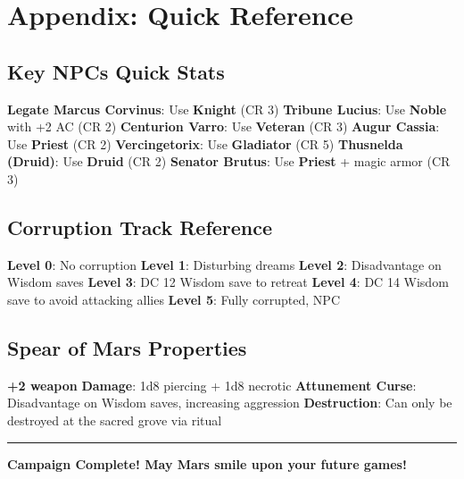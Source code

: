 \documentclass[
]{book}
\begin{document}
\section{Appendix: Quick Reference}\label{appendix-quick-reference}

\subsection{Key NPCs Quick Stats}\label{key-npcs-quick-stats}

\textbf{Legate Marcus Corvinus}: Use \textbf{Knight} (CR 3)
\textbf{Tribune Lucius}: Use \textbf{Noble} with +2 AC (CR 2)
\textbf{Centurion Varro}: Use \textbf{Veteran} (CR 3) \textbf{Augur
Cassia}: Use \textbf{Priest} (CR 2) \textbf{Vercingetorix}: Use
\textbf{Gladiator} (CR 5) \textbf{Thusnelda (Druid)}: Use \textbf{Druid}
(CR 2) \textbf{Senator Brutus}: Use \textbf{Priest} + magic armor (CR 3)

\subsection{Corruption Track
Reference}\label{corruption-track-reference}

\textbf{Level 0}: No corruption \textbf{Level 1}: Disturbing dreams
\textbf{Level 2}: Disadvantage on Wisdom saves \textbf{Level 3}: DC 12
Wisdom save to retreat \textbf{Level 4}: DC 14 Wisdom save to avoid
attacking allies \textbf{Level 5}: Fully corrupted, NPC

\subsection{Spear of Mars Properties}\label{spear-of-mars-properties}

\textbf{+2 weapon} \textbf{Damage}: 1d8 piercing + 1d8 necrotic
\textbf{Attunement Curse}: Disadvantage on Wisdom saves, increasing
aggression \textbf{Destruction}: Can only be destroyed at the sacred
grove via ritual

\begin{center}\rule{0.5\linewidth}{0.5pt}\end{center}

\textbf{Campaign Complete! May Mars smile upon your future games!}


\backmatter
\end{document}
